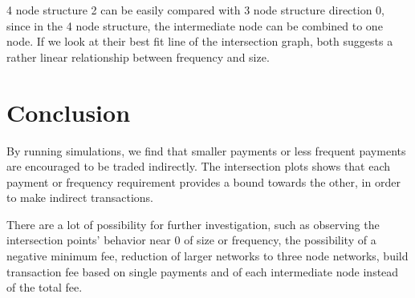 \documentclass[twocolumn,10pt]{report}
\begin{document}
4 node structure 2 can be easily compared with 3 node structure direction 0, since in the 4 node structure, the intermediate node can be combined to one node. If we look at their best fit line of the intersection graph, both suggests a rather linear relationship between frequency and size. 




\section{Conclusion}
By running simulations, we find that smaller payments or less frequent payments are encouraged to be traded indirectly. The intersection plots shows that each payment or frequency requirement provides a bound towards the other, in order to make indirect transactions. 

There are a lot of possibility for further investigation, such as observing the intersection points' behavior near 0 of size or frequency, the possibility of a negative minimum fee, reduction of larger networks to three node networks, build transaction fee based on single payments and of each intermediate node instead of the total fee.
\end{document}
